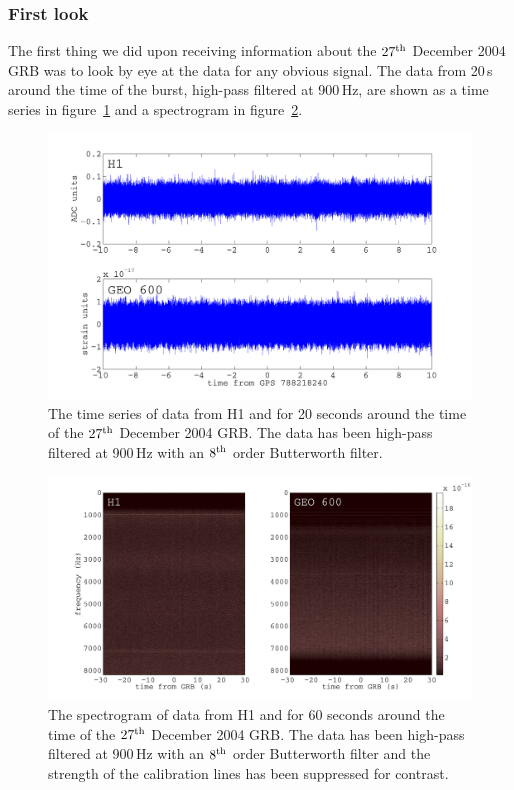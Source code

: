 \subsubsection{First look}
The first thing we did upon receiving information about the $27^{\rm th}$ December 2004 GRB was to
look by eye at the data for any obvious signal. The data from 20\,s around the time of the burst,
high-pass filtered at 900\,Hz, are shown as a time series in figure~\ref{SGRTimeSeries} and a
spectrogram in figure~\ref{SGRSpecgram}.
\begin{figure}[!htbp]
\begin{center}
\includegraphics[width=1.0\textwidth]{figs/SGRTimeSeries}\caption[The time series of data from H1
and \geo for 20 seconds around the time of the $27^{\rm th}$ December 2004 GRB.]{The time series of
data from H1 and \geo for 20 seconds around the time of the $27^{\rm th}$ December 2004 GRB. The
data has been high-pass filtered at 900\,Hz with an $8^{\rm th}$ order Butterworth
filter.}\label{SGRTimeSeries}
\end{center}
\end{figure}
\begin{figure}[!htbp]
\begin{center}
\includegraphics[width=1.0\textwidth]{figs/SGRSpecgram}\caption[The spectrogram of data from H1 and
\geo for 60 seconds around the time of the $27^{\rm th}$ December 2004 GRB.]{The spectrogram of
data from H1 and \geo for 60 seconds around the time of the $27^{\rm th}$ December 2004 GRB. The
data has been high-pass filtered at 900\,Hz with an $8^{\rm th}$ order Butterworth filter and the
strength of the \geo calibration lines has been suppressed for contrast.}\label{SGRSpecgram}
\end{center}
\end{figure}

